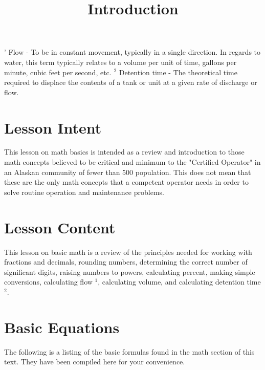 \documentclass[10pt]{article}
\title{Introduction }
\author{}
\date{}
\begin{document}
\maketitle
' Flow - To be in constant movement, typically in a single direction. In regards to water, this term typically relates to a volume per unit of time, gallons per minute, cubic feet per second, etc. ${ }^{2}$ Detention time - The theoretical time required to displace the contents of a tank or unit at a given rate of discharge or flow.

\section{Lesson Intent}
This lesson on math basics is intended as a review and introduction to those math concepts believed to be critical and minimum to the "Certified Operator" in an Alaskan community of fewer than 500 population. This does not mean that these are the only math concepts that a competent operator needs in order to solve routine operation and maintenance problems.

\section{Lesson Content}
This lesson on basic math is a review of the principles needed for working with fractions and decimals, rounding numbers, determining the correct number of significant digits, raising numbers to powers, calculating percent, making simple conversions, calculating flow ${ }^{1}$, calculating volume, and calculating detention time ${ }^{2}$.

\section{Basic Equations}
The following is a listing of the basic formulas found in the math section of this text. They have been compiled here for your convenience.
\end{document}
